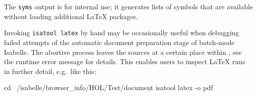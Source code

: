 \begin{isabellebody}
\begin{isamarkuptext}
  The \verb|syms| output is for internal use; it generates lists
  of symbols that are available without loading additional {\LaTeX}
  packages.%
\end{isamarkuptext}%
\isamarkuptrue%
%
\isamarkuptrue%
%
\begin{isamarkuptext}%
Invoking \verb|isatool latex| by hand may be occasionally
  useful when debugging failed attempts of the automatic document
  preparation stage of batch-mode Isabelle.  The abortive process
  leaves the sources at a certain place within \hyperlink{setting.ISABELLE-BROWSER-INFO}{\mbox{}}, see the runtime error message for details.
  This enables users to inspect {\LaTeX} runs in further detail, e.g.\
  like this:
\begin{ttbox}
  cd ~/isabelle/browser_info/HOL/Test/document
  isatool latex -o pdf
\end{ttbox}%
\end{isamarkuptext}%
\isamarkuptrue%
%
\isadelimtheory
%
\endisadelimtheory
%
\isatagtheory
{}\isamarkupfalse%
%
\endisatagtheory
{\isafoldtheory}%
%
\isadelimtheory
%
\endisadelimtheory
\end{isabellebody}%
